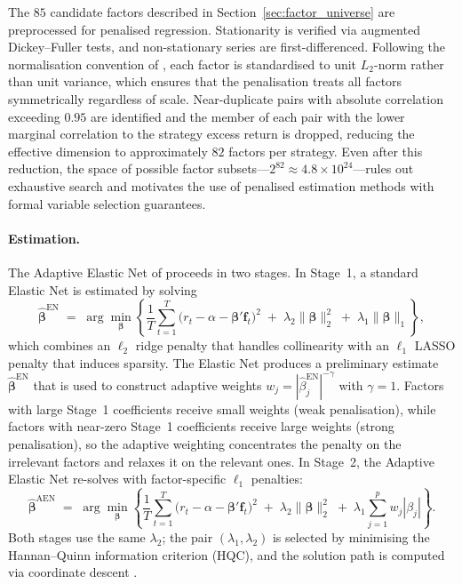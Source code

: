 The $85$ candidate factors described in Section~\ref{sec:factor_universe}
are preprocessed for penalised regression. Stationarity is verified via
augmented Dickey--Fuller tests, and non-stationary series are
first-differenced. Following the
normalisation convention of \citet{zou2009adaptive}, each factor is
standardised to unit $L_2$-norm rather than unit variance, which
ensures that the penalisation treats all factors symmetrically
regardless of scale. Near-duplicate pairs with absolute correlation
exceeding $0.95$ are identified and the member of each pair with the
lower marginal correlation to the strategy excess return is dropped, reducing
the effective dimension to approximately $82$ factors per strategy.
Even after this reduction, the space of possible factor
subsets---$2^{82} \approx 4.8 \times 10^{24}$---rules out exhaustive
search and motivates the use of penalised estimation methods with
formal variable selection guarantees.

\paragraph{Estimation.}

The Adaptive Elastic Net of \citet{zou2009adaptive} proceeds in two
stages. In Stage~1, a standard Elastic Net is estimated by solving
\begin{equation}\label{eq:elastic_net}
\hat{\boldsymbol{\beta}}^{\text{EN}} \;=\; \arg\min_{\boldsymbol{\beta}}
\left\{
\frac{1}{T}\sum_{t=1}^{T}\bigl(r_t - \alpha -
\boldsymbol{\beta}'\mathbf{f}_t\bigr)^2
\;+\; \lambda_2 \|\boldsymbol{\beta}\|_2^2
\;+\; \lambda_1 \|\boldsymbol{\beta}\|_1
\right\},
\end{equation}
which combines an $\ell_2$ ridge penalty that handles collinearity
with an $\ell_1$ LASSO penalty that induces sparsity. The Elastic Net
produces a preliminary estimate $\hat{\boldsymbol{\beta}}^{\text{EN}}$
that is used to construct adaptive weights
$w_j = |\hat{\beta}^{\text{EN}}_j|^{-\gamma}$ with $\gamma = 1$.
Factors with large Stage~1 coefficients receive small weights (weak
penalisation), while factors with near-zero Stage~1 coefficients
receive large weights (strong penalisation), so the adaptive
weighting concentrates the penalty on the irrelevant factors and
relaxes it on the relevant ones. In Stage~2, the Adaptive Elastic
Net re-solves with factor-specific $\ell_1$ penalties:
\begin{equation}\label{eq:aen}
\hat{\boldsymbol{\beta}}^{\text{AEN}} \;=\; \arg\min_{\boldsymbol{\beta}}
\left\{
\frac{1}{T}\sum_{t=1}^{T}\bigl(r_t - \alpha -
\boldsymbol{\beta}'\mathbf{f}_t\bigr)^2
\;+\; \lambda_2 \|\boldsymbol{\beta}\|_2^2
\;+\; \lambda_1 \sum_{j=1}^{p} w_j |\beta_j|
\right\}.
\end{equation}
Both stages use the same $\lambda_2$; the pair
$(\lambda_1, \lambda_2)$ is selected by minimising the Hannan--Quinn
information criterion (HQC), and the solution path is computed via
coordinate descent \citep{friedman2010regularization}.

